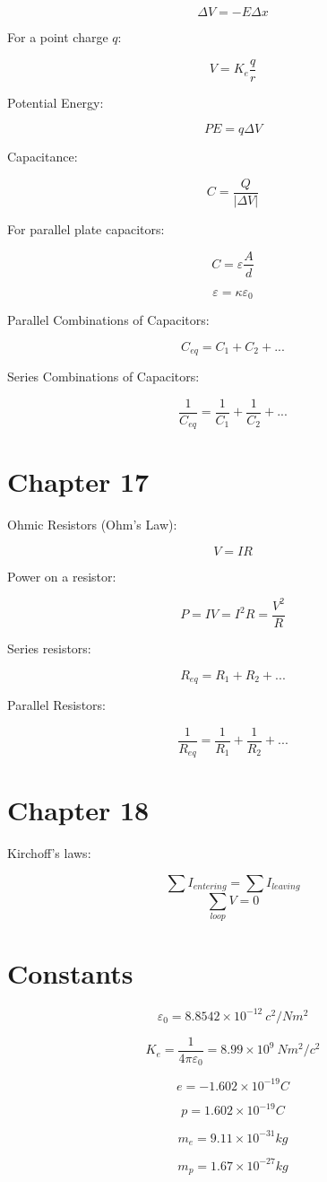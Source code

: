 \documentclass{article}
\begin{document}
	$$ \Delta V = -E \Delta x $$
	
	For a point charge $q$:
	
	$$ V = K_e \frac{q}{r} $$
	
	Potential Energy:
	
	$$ \mathit{PE} = q \Delta V $$
	
	Capacitance:
	
	$$ C = \frac{Q}{|\Delta V|} $$
	
	For parallel plate capacitors:
	
	$$ C = \varepsilon \frac{A}{d} $$
	
	$$ \varepsilon = \kappa \varepsilon_0 $$
	
	Parallel Combinations of Capacitors:
	
	$$ C_{eq} = C_1 + C_2 + ... $$
	
	Series Combinations of Capacitors:
	
	$$ \frac{1}{C_{eq}} = \frac{1}{C_1} + \frac{1}{C_2} + ... $$
	
	\section{Chapter 17}
	
	Ohmic Resistors (Ohm's Law):
	
	$$ V = IR $$
	
	Power on a resistor:
	
	$$ P = IV = I^2 R = \frac{V^2}{R} $$
	
	Series resistors:
	
	$$ R_{eq} = R_1 + R_2 + ... $$
	
	Parallel Resistors:
	
	$$ \frac{1}{R_{eq}} = \frac{1}{R_1} + \frac{1}{R_2} + ... $$
	
	
	\section{Chapter 18}
	
	Kirchoff's laws:
	
	$$ \sum I_{entering} = \sum I_{leaving} $$
	$$ \sum_{loop} V = 0 $$
	
	\section{Constants}
	
	$$ \varepsilon_0 = 8.8542 \times 10 ^{-12} \ c^2/Nm^2$$
	
	$$ K_e = \frac{1}{4\pi \varepsilon_0} = 8.99 \times 10^9 \ Nm^2/c^2 $$
	
	$$ e = -1.602 \times 10^{-19} C $$
	
	$$ p = 1.602 \times 10^{-19} C $$
	
	$$ m_e = 9.11 \times 10^{-31} kg $$
	
	$$ m_p = 1.67 \times 10^{-27} kg $$
	
	
	
	
	
	
	
	
	
\end{document}
